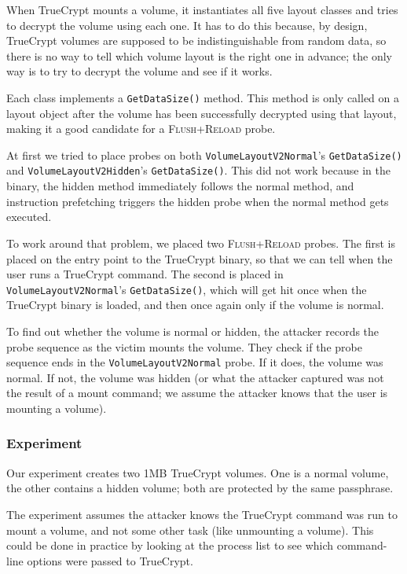 \documentclass[letterpaper,twocolumn,10pt]{article}
\begin{document}
When TrueCrypt mounts a volume, it instantiates all five layout classes and
tries to decrypt the volume using each one. It has to do this because, by
design, TrueCrypt volumes are supposed to be indistinguishable from random data,
so there is no way to tell which volume layout is the right one in advance; the
only way is to try to decrypt the volume and see if it works.

Each class implements a \texttt{GetDataSize()} method. This method is only
called on a layout object after the volume has been successfully decrypted using
that layout, making it a good candidate for a \textsc{Flush+Reload} probe.

At first we tried to place probes on both \texttt{VolumeLayout\-V2Normal}'s
\texttt{GetDataSize()} and \texttt{VolumeLayout\-V2Hidden}'s
\texttt{GetDataSize()}. This did not work because in the binary, the hidden
method immediately follows the normal method, and instruction prefetching
triggers the hidden probe when the normal method gets executed.

To work around that problem, we placed two \textsc{Flush+Reload} probes. The
first is placed on the entry point to the TrueCrypt binary, so that we can tell
when the user runs a TrueCrypt command. The second is placed in
\texttt{VolumeLayout\-V2Normal}'s \texttt{GetDataSize()}, which will get hit
once when the TrueCrypt binary is loaded, and then once again only if the volume
is normal.

To find out whether the volume is normal or hidden, the attacker records the
probe sequence as the victim mounts the volume. They check if the probe sequence
ends in the \texttt{VolumeLayout\-V2Normal} probe. If it does, the volume was
normal. If not, the volume was hidden (or what the attacker captured was not the
result of a mount command; we assume the attacker knows that the user is
mounting a volume).

\subsubsection{Experiment}

Our experiment creates two 1MB TrueCrypt volumes. One is a normal volume, the
other contains a hidden volume; both are protected by the same passphrase.

The experiment assumes the attacker knows the TrueCrypt command was run to mount
a volume, and not some other task (like unmounting a volume). This could be done
in practice by looking at the process list to see which command-line options
were passed to TrueCrypt.
\end{document}
